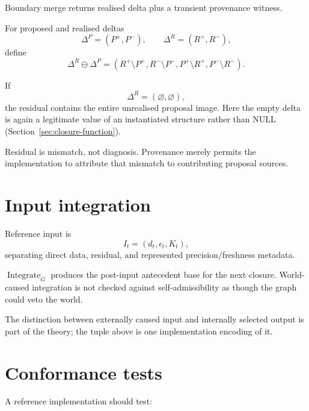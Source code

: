 \documentclass[11pt,a4paper]{article}
\theoremstyle{remark}
\begin{document}
Boundary merge returns realised delta plus a transient provenance witness.

For proposed and realised deltas
\[
\Delta^P=(P^+,P^-),
\qquad
\Delta^R=(R^+,R^-),
\]
define
\[
\boxed{
\Delta^R\ominus\Delta^P
=
\left(
R^+\setminus P^+,
R^-\setminus P^-,
P^+\setminus R^+,
P^-\setminus R^-
\right).
}
\]

If
\[
\Delta^R=(\varnothing,\varnothing),
\]
the residual contains the entire unrealised proposal image. Here the empty delta is again a legitimate value of an instantiated structure rather than NULL (Section~\ref{sec:closure-function}).

Residual is mismatch, not diagnosis. Provenance merely permits the implementation to attribute that mismatch to contributing proposal sources.

\section{Input integration}\label{sec:input}

Reference input is
\[
I_t=(d_t,\epsilon_t,K_t),
\]
separating direct data, residual, and represented precision/freshness metadata.

$\operatorname{Integrate}_G$ produces the post-input antecedent base for the next closure. World-caused integration is not checked against self-admissibility as though the graph could veto the world.

The distinction between externally caused input and internally selected output is part of the theory; the tuple above is one implementation encoding of it.

\section{Conformance tests}\label{sec:tests}

A reference implementation should test:
\end{document}
